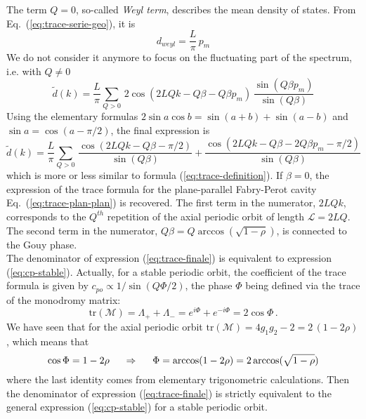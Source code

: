 \documentclass[10pt]{iopart}
\begin{document}
The term $Q=0$, so-called \emph{Weyl term}, describes the mean density of states. From Eq.~(\ref{eq:trace-serie-geo}), it is
\begin{equation}
d_{weyl}=\frac{L}{\pi}\,p_m
\end{equation}
We do not consider it anymore to focus on the fluctuating part of the spectrum, i.e. with $Q\neq 0$
\begin{equation}
\tilde{d}(k)=\frac{L}{\pi} \sum_{Q>0}\, 2\cos(2LQk-Q\beta-Q\beta p_m)\,\frac{\sin (Q\beta p_m)}{\sin (Q\beta)}
\end{equation}
Using the elementary formulas $2\sin a\cos b = \sin(a+b)+\sin(a-b)$ and $\sin a = \cos(a-\pi/2)$, the final expression is
\begin{equation} \label{eq:trace-finale}
\tilde{d}(k) = \frac{L}{\pi} \sum_{Q>0}\, \frac{\cos(2LQk-Q\beta-\pi/2)}{\sin (Q\beta)}+ \frac{\cos(2LQk-Q\beta-2Q\beta p_m-\pi/2)}{\sin (Q\beta)}
\end{equation}
which is more or less similar to formula (\ref{eq:trace-definition}). If $\beta=0$, the expression of the trace formula for the plane-parallel Fabry-Perot cavity Eq.~(\ref{eq:trace-plan-plan}) is recovered. The first term in the numerator, $2LQk$, corresponds to the $Q^{th}$ repetition of the axial periodic orbit of length $\mathcal{L}=2LQ$.  The second term in the numerator, $Q\beta=Q\arccos(\sqrt{1-\rho})$, is connected to the Gouy phase.\\

The denominator of expression (\ref{eq:trace-finale}) is equivalent to expression (\ref{eq:cp-stable}). Actually, for a stable periodic orbit, the coefficient of the trace formula is given by $c_{po}\propto 1/\sin(Q\Phi / 2)$, the phase $\Phi$ being defined via the trace of the monodromy matrix:
\begin{equation} \textrm{tr}(\mathcal{M}) = \Lambda_+ + \Lambda_- = e^{i\Phi} + e^{-i\Phi} = 2 \cos\Phi \, . \end{equation}
We have seen that for the axial periodic orbit $\textrm{tr}(\mathcal{M}) = 4 g_1 g_2 - 2 = 2\,(1 - 2\rho)$, which means that
\begin{equation} \label{eq:Phi}
\cos\Phi = 1 - 2\rho \hspace{0.5cm} \Rightarrow \hspace{0.5cm} \Phi = \arccos(1 - 2\rho) = 2 \arccos(\sqrt{1-\rho})
\end{equation}
where the last identity comes from elementary trigonometric calculations. Then the denominator of expression (\ref{eq:trace-finale}) is strictly equivalent to the general expression (\ref{eq:cp-stable}) for a stable periodic orbit.\\
\end{document}

